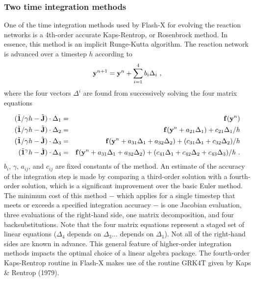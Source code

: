 \subsubsection{Two time integration methods}


One of the time integration methods used by Flash-X for evolving the
reaction networks is a 4th-order accurate Kaps-Rentrop, or Rosenbrock method. In
essence, this method is an implicit Runge-Kutta algorithm.  The
reaction network is advanced over a timestep $h$ according to
\begin{equation}
\label{Eqn:kr1}
{\bf y}^{n+1} = {\bf y}^n + \sum_{i=1}^4 b_i \Delta_i
\ ,
\end{equation}
where the four vectors $\Delta^i$ are found from successively
solving the four matrix equations

\begin{eqnarray}
(\tilde{{\bf 1}}/\gamma h - \tilde{{\bf J}}) \cdot \Delta_1 & = &
{\bf f} ({\bf y}^n)\\
(\tilde{{\bf 1}}/\gamma h - \tilde{{\bf J}}) \cdot \Delta_2 & = &
{\bf f} ({\bf y}^n + a_{21}\Delta_1) + c_{21}\Delta_1/h\\
(\tilde{{\bf 1}}/\gamma h - \tilde{{\bf J}}) \cdot \Delta_3 & = &
{\bf f} ({\bf y}^n + a_{31}\Delta_1 + a_{32}\Delta_2) +
(c_{31}\Delta_1 + c_{32}\Delta_2)/h\\
(\tilde{{\bf 1}}^\gamma h - \tilde{{\bf J}}) \cdot \Delta_4 & = &
{\bf f} ({\bf y}^n + a_{31}\Delta_1 + a_{32}\Delta_2) +
(c_{41}\Delta_1 + c_{42}\Delta_2 + c_{43}\Delta_3)/h
\ .
\end{eqnarray}
$b_i$, $\gamma$, $a_{ij}$, and $c_{ij}$ are
fixed constants of the method.  An estimate of the accuracy of the
integration step is made by comparing a third-order solution with a
fourth-order solution, which is a significant improvement over the
basic Euler method.  The minimum cost of this method $-$ which applies
for a single timestep that meets or exceeds a specified integration
accuracy $-$ is one Jacobian evaluation, three evaluations of the
right-hand side, one matrix decomposition, and four backsubstitutions.
Note that the four matrix equations represent a staged set of linear equations
($\Delta_4$ depends on $\Delta_3 \ldots$ depends on $\Delta_1$).  Not
all of the right-hand sides are known in advance. This general feature
of higher-order integration methods impacts the optimal choice of a
linear algebra package.  The fourth-order Kaps-Rentrop routine in
Flash-X makes use of the routine GRK4T given by Kaps \& Rentrop
(1979).

